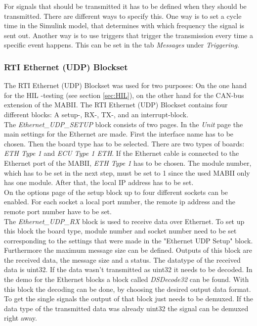 \documentclass[ExampleMasters.tex]{subfiles}
\begin{document}
For signals that should be transmitted it has to be defined when they should be transmitted. There are different ways to specify this. One way is to set a cycle time in the Simulink model, that determines with which frequency the signal is sent out. Another way is to use triggers that trigger the transmission every time a specific event happens. This can be set in the tab \textit{Messages} under \textit{Triggering}.

\subsubsection{RTI Ethernet (UDP) Blockset}
The \gls{RTI} Ethernet (\gls{UDP}) Blockset was used for two purposes: On the one hand for the \gls{HIL} -testing (see section \ref{sec:HIL}), on the other hand for the \gls{CAN}-bus extension of the \gls{MABII}. The \gls{RTI} Ethernet (UDP) Blockset contains four different blocks: A setup-, RX-, TX-, and an interrupt-block.\\
The \textit{Ethernet\_UDP\_SETUP} block consists of two pages. In the \textit{Unit} page the main settings for the Ethernet are made. First the interface name has to be chosen. Then the board type has to be selected. There are two types of boards: \textit{ETH Type 1} and \textit{ECU Type 1 ETH}. If the Ethernet cable is connected to the Ethernet port of the \gls{MABII}, \textit{ETH Type 1} has to be chosen. The module number, which has to be set in the next step, must be set to 1 since the used \gls{MABII} only has one module.
After that, the local \gls{IP} address has to be set.\\
On the options page of the setup block up to four different sockets can be enabled. For each socket a local port number, the remote ip address and the remote port number have to be set.\\
 
The \textit{Ethernet\_UDP\_RX} block is used to receive data over Ethernet. To set up this block the board type, module number and socket number need to be set corresponding to the settings that were made in the "Ethernet \gls{UDP} Setup" block. Furthermore the maximum message size can be defined. Outputs of this block are the received data, the message size and a status. The datatype of the received data is uint32. If the data wasn't transmitted as uint32 it needs to be decoded. In the demo for the Ethernet blocks a block called \textit{DSDecode32} can be found. With this block the decoding can be done, by choosing the desired output data format. To get the single signals the output of that block just needs to be demuxed. If the data type of the transmitted data was already uint32 the signal can be demuxed right away.
\end{document}
